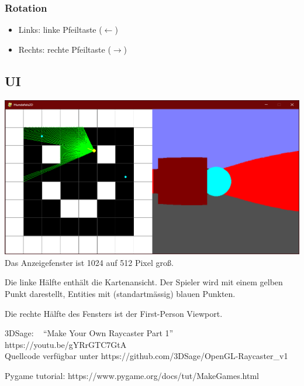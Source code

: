 \documentclass[a4paper,titlepage]{article}
\begin{document}
\subsubsection*{Rotation}
\begin{itemize}
\item Links: linke Pfeiltaste ($\leftarrow$)
\item Rechts: rechte Pfeiltaste ($\rightarrow$)
\end{itemize}

\subsection{UI}
\includegraphics[scale=0.5]{./img/ui3}\\
Das Anzeigefenster ist 1024 auf 512 Pixel groß.

Die linke Hälfte enthält die Kartenansicht. Der Spieler wird mit einem gelben Punkt darestellt, Entities mit (standartmässig) blauen Punkten.

Die rechte Hälfte des Fensters ist der First-Person Viewport.

\newpage

\begin{flushleft}
\begin{thebibliography}{99}
	
 3DSage: ~ ``Make Your Own Raycaster Part 1'' ~ https://youtu.be/gYRrGTC7GtA\\ Quellcode verfügbar unter https://github.com/3DSage/OpenGL-Raycaster\_v1

 Pygame tutorial: 	https://www.pygame.org/docs/tut/MakeGames.html
\end{thebibliography}
\end{flushleft}
\end{document}
